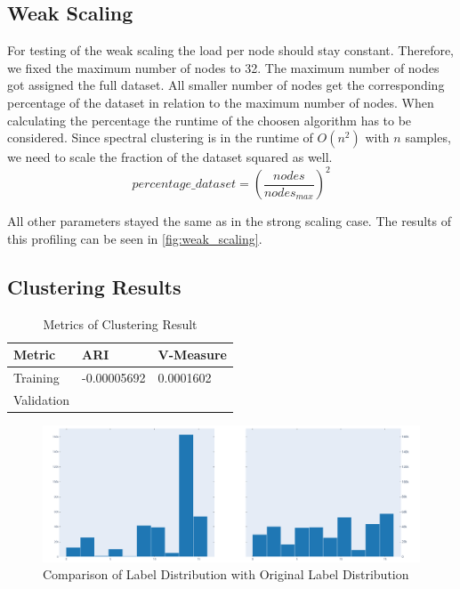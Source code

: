 \subsection{Weak Scaling}
\label{subsec:weak_scaling}


For testing of the weak scaling the load per node should stay constant. Therefore, we fixed the
maximum number of nodes to 32.
The maximum number of nodes got assigned the full dataset. All smaller number of nodes get the corresponding
percentage of the dataset in relation to the maximum number of nodes. When calculating the percentage the runtime
of the choosen algorithm has to be considered. Since spectral clustering is in the runtime of \(O(n^2)\) with \(n\) samples,
we need to scale the fraction of the dataset squared as well.
\[percentage\_dataset = \left(\frac{nodes}{nodes_{max}}\right)^2\]

All other parameters stayed the same as in the strong scaling case.
The results of this profiling can be seen in \cref{fig:weak_scaling}.




\subsection{Clustering Results}
\label{subsec:clustering_results}

\begin{table}
    \centering
    \begin{tabular}{lll}
      \toprule
      Metric     &  ARI & V-Measure \\
      \midrule
      Training   &  -0.00005692  &  0.0001602     \\
      Validation &   & \\
      \bottomrule
    \end{tabular}
    \caption{Metrics of Clustering Result}
    \label{tab:clustering_results}
  \end{table}

  \begin{figure}
    \centering
    \includegraphics[width=0.9\linewidth]{images/label_distribution.png}
    \caption{Comparison of Label Distribution with Original Label Distribution}
    \label{fig:label_distribution}
  \end{figure}

